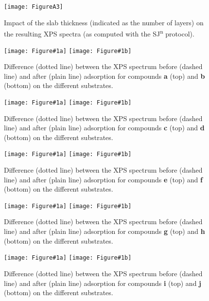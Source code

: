 \documentclass[12pt,a4paper]{article}
\begin{document}
\begin{figure}[!h]
	\centering
	\texttt{[image: FigureA3]}
	\caption{Impact of the slab thickness (indicated as the number of layers) on the resulting XPS spectra (as computed with the SJ\textsuperscript{n} protocol).}
	\label{fig:slabsthicknessSJn}
\end{figure}


\newcommand{\XPSsa}[3]{
\begin{figure}[!h]
	\centering
	\texttt{[image: Figure\#1a]}
	\texttt{[image: Figure\#1b]}
	\caption{Difference (dotted line) between the XPS spectrum before (dashed line) and after (plain line) adsorption for compounds \textbf{#2} (top) and \textbf{#3} (bottom) on the different substrates.}
	\label{fig:spectraXPSab#2#3}
\end{figure}
}

\XPSsa{A4}{a}{b}
\XPSsa{A5}{c}{d}
\XPSsa{A6}{e}{f}
\XPSsa{A7}{g}{h}
\XPSsa{A8}{i}{j}


	
\end{document}
